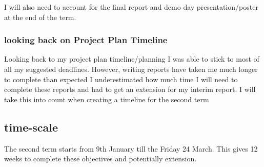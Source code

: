 \documentclass{report}
\begin{document}
I will also need to account for the final report and demo day presentation/poster at the end of the term.

\subsubsection{looking back on Project Plan Timeline}

Looking back to my project plan timeline/planning I was able to stick to most of all my suggested deadlines. However, writing reports have taken me much longer to complete than expected I underestimated how much time I will need to complete these reports and had to get an extension for my interim report. I will take this into count when creating a timeline for the second term

\subsection{time-scale}

The second term starts from 9th January till the Friday 24 March. This gives 12 weeks to complete these objectives and potentially extension. 
\end{document}
